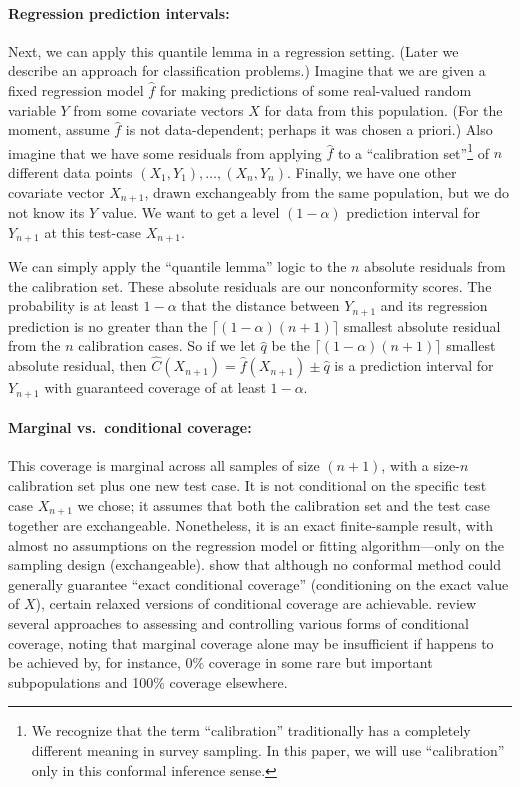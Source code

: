 \documentclass[10.5pt, letterpaper]{article}
\numberwithin{table}{section}
\numberwithin{figure}{section}
\numberwithin{equation}{section}
\begin{document}
\paragraph{Regression prediction intervals:} Next, we can apply this quantile lemma in a regression setting. (Later we describe an approach for classification problems.) Imagine that we are given a fixed regression model $\hat f$ for making predictions of some real-valued random variable $Y$ from some covariate vectors $X$ for data from this population. (For the moment, assume $\hat f$ is not data-dependent; perhaps it was chosen a priori.) Also imagine that we have some residuals from applying $\hat f$ to a ``calibration set''\footnote{We recognize that the term ``calibration'' traditionally has a completely different meaning in survey sampling. In this paper, we will use ``calibration'' only in this conformal inference sense.} of $n$ different data points $(X_1,Y_1),\ldots,(X_n,Y_n)$.
Finally, we have one other covariate vector $X_{n+1}$, drawn exchangeably from the same population, but we do not know its $Y$ value. We want to get a level $(1-\alpha)$ prediction interval for $Y_{n+1}$ at this test-case $X_{n+1}$.

We can simply apply the ``quantile lemma'' logic to the $n$ absolute residuals from the calibration set. These absolute residuals are our nonconformity scores. The probability is at least $1-\alpha$ that the distance between $Y_{n+1}$ and its regression prediction is no greater than the $\lceil(1-\alpha)(n+1)\rceil$ smallest absolute residual from the $n$ calibration cases.
So if we let $\hat q$ be the $\lceil(1-\alpha)(n+1)\rceil$ smallest absolute residual,
then $\hat C(X_{n+1}) = \hat f (X_{n+1}) \pm \hat q$ is a prediction interval for $Y_{n+1}$ with
guaranteed coverage of at least $1-\alpha$.


\paragraph{Marginal vs.\ conditional coverage:} This coverage is marginal across all samples of size $(n+1)$, with a size-$n$ calibration set plus one new test case. It is not conditional on the specific test case $X_{n+1}$ we chose; it assumes that both the calibration set and the test case together are exchangeable. Nonetheless, it is an exact finite-sample result, with almost no assumptions on the regression model or fitting algorithm---only on the sampling design (exchangeable). \cite{barber2021limits} show that although no conformal method could generally guarantee ``exact conditional coverage'' (conditioning on the exact value of $X$), certain relaxed versions of conditional coverage are achievable. \cite{angelopoulos2022gentle} review several approaches to assessing and controlling various forms of conditional coverage, noting that marginal coverage alone may be insufficient if happens to be achieved by, for instance, 0\% coverage in some rare but important subpopulations and 100\% coverage elsewhere.
\end{document}
